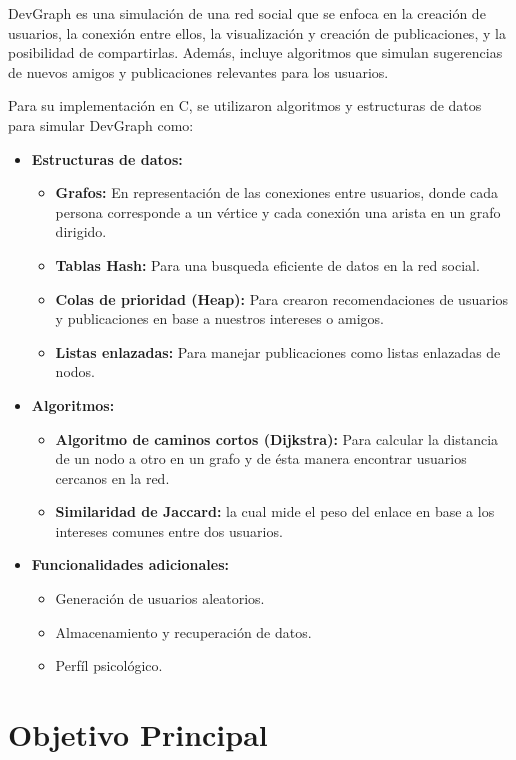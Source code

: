 \documentclass[9pt,letterpaper,onecolumn]{rho-class/rho}
\begin{document}
DevGraph es una simulación de una red social que se enfoca en la creación de usuarios, la conexión entre ellos, la visualización y creación de publicaciones, y la posibilidad de compartirlas. Además, incluye algoritmos que simulan sugerencias de nuevos amigos y publicaciones relevantes para los usuarios.

Para su implementación en C, se utilizaron algoritmos y estructuras de datos para simular DevGraph como:

\begin{itemize}

\item \textbf{Estructuras de datos:}
\begin{itemize}
\item \textbf{Grafos:} En representación de las conexiones entre usuarios, donde cada persona corresponde a un vértice y cada conexión una arista en un grafo dirigido.
\item \textbf{Tablas Hash:} Para una busqueda eficiente de datos en la red social.
\item \textbf{Colas de prioridad (Heap):} Para crearon recomendaciones de usuarios y publicaciones en base a nuestros intereses o amigos.
\item \textbf{Listas enlazadas:} Para manejar publicaciones como listas enlazadas de nodos.
\end{itemize}
\item \textbf{Algoritmos:}
\begin{itemize}
\item \textbf{Algoritmo de caminos cortos (Dijkstra):} Para calcular la distancia de un nodo a otro en un grafo y de ésta manera encontrar usuarios cercanos en la red.
\item \textbf{Similaridad de Jaccard:} la cual mide el peso del enlace en base a los intereses comunes entre dos usuarios.
\end{itemize}
\item \textbf{Funcionalidades adicionales:}
\begin{itemize}
\item Generación de usuarios aleatorios.
\item Almacenamiento y recuperación de datos.
\item Perfíl psicológico.
\end{itemize}
\end{itemize}

\section{Objetivo Principal}
\end{document}
